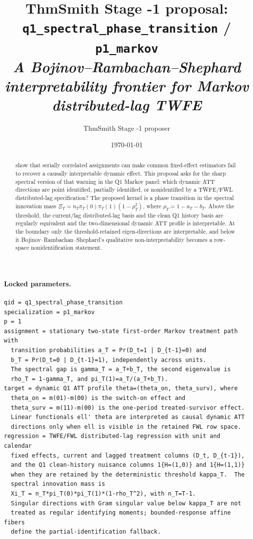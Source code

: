 \documentclass[11pt]{article}
\title{ThmSmith Stage -1 proposal: \texttt{q1\_spectral\_phase\_transition} / \texttt{p1\_markov}%
  \\ \large\textit{A Bojinov--Rambachan--Shephard interpretability frontier for Markov distributed-lag TWFE}}
\author{ThmSmith Stage -1 proposer}
\date{\today}
\theoremstyle{definition}
\theoremstyle{plain}
\theoremstyle{remark}
\begin{document}
\maketitle


\paragraph{Locked parameters.}
\begin{verbatim}
qid = q1_spectral_phase_transition
specialization = p1_markov
p = 1
assignment = stationary two-state first-order Markov treatment path with
  transition probabilities a_T = Pr(D_t=1 | D_{t-1}=0) and
  b_T = Pr(D_t=0 | D_{t-1}=1), independently across units.
  The spectral gap is gamma_T = a_T+b_T, the second eigenvalue is
  rho_T = 1-gamma_T, and pi_T(1)=a_T/(a_T+b_T).
target = dynamic Q1 ATT profile theta=(theta_on, theta_surv), where
  theta_on = m(01)-m(00) is the switch-on effect and
  theta_surv = m(11)-m(00) is the one-period treated-survivor effect.
  Linear functionals ell' theta are interpreted as causal dynamic ATT
  directions only when ell is visible in the retained FWL row space.
regression = TWFE/FWL distributed-lag regression with unit and calendar
  fixed effects, current and lagged treatment columns (D_t, D_{t-1}),
  and the Q1 clean-history nuisance columns 1{H=(1,0)} and 1{H=(1,1)}
  when they are retained by the deterministic threshold kappa_T.  The
  spectral innovation mass is
  Xi_T = n_T*pi_T(0)*pi_T(1)*(1-rho_T^2), with n_T=T-1.
  Singular directions with Gram singular value below kappa_T are not
  treated as regular identifying moments; bounded-response affine fibers
  define the partial-identification fallback.
\end{verbatim}

\begin{abstract}
\citet{bojinov2021panel} show that serially correlated assignments can make common fixed-effect estimators fail to recover a causally interpretable dynamic effect.
This proposal asks for the sharp spectral version of that warning in the Q1 Markov panel: which dynamic ATT directions are point identified, partially identified, or nonidentified by a TWFE/FWL distributed-lag specification?
The proposed kernel is a phase transition in the spectral innovation mass \(\Xi_T=n_T\pi_T(0)\pi_T(1)(1-\rho_T^2)\), where \(\rho_T=1-a_T-b_T\).
Above the threshold, the current/lag distributed-lag basis and the clean Q1 history basis are regularly equivalent and the two-dimensional dynamic ATT profile is interpretable.
At the boundary only the threshold-retained eigen-directions are interpretable, and below it Bojinov--Rambachan--Shephard's qualitative non-interpretability becomes a row-space nonidentification statement.
\end{abstract}
\end{document}
